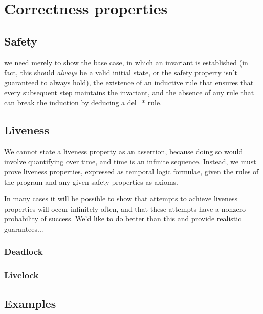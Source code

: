 \section{Correctness properties}

\subsection{Safety}

we need merely to show the base case, in which an invariant is established (in fact, this should \emph{always} be a valid 
initial state, or the safety property isn't guaranteed to always hold), the existence of an inductive rule that ensures that every 
subsequent step maintains the invariant, and the absence of any rule that can break the induction by deducing a del\_* rule.

\subsection{Liveness}

We cannot state a liveness property as an assertion, because doing so would involve quantifying over time,
and time is an infinite sequence.  Instead, we must prove liveness properties, expressed as temporal logic
formulae, given the rules of the program and any given safety properties as axioms.

In many cases it will be possible to show that attempts to achieve liveness properties will occur infinitely often, and that
these attempts have a nonzero probability of success.  We'd like to do better than this and provide realistic guarantees...

\subsubsection{Deadlock}



\subsubsection{Livelock}

\subsection{Examples}
